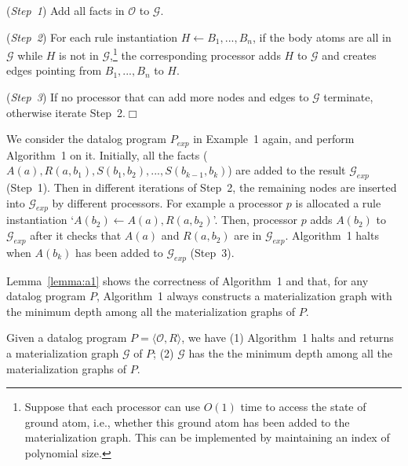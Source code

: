 \documentclass{article}
\begin{document}
(\emph{Step~1}) Add all facts in $\mathcal{O}$ to $\mathcal{G}$.

(\emph{Step~2}) For each rule instantiation $H\leftarrow B_1,...,B_n$, if the body atoms are all in $\mathcal{G}$ while $H$ is not in $\mathcal{G}$,\footnote{Suppose that each processor can use $O(1)$ time to access the state of ground atom, i.e., whether this ground atom has been added to the materialization graph. This can be implemented by maintaining an
index of polynomial size.}
the corresponding processor adds $H$ to $\mathcal{G}$ and creates edges pointing from $B_1,...,B_n$ to $H$.

(\emph{Step~3}) If no processor that can add more nodes and edges to $\mathcal{G}$ terminate, otherwise iterate Step~2.\hfill$\Box$\\

\begin{example}
We consider the datalog program $P_{exp}$ in Example~1 again, and perform Algorithm~1 on it. Initially, all the facts
($A(a),R(a,b_1),S(b_1,b_2),...,S(b_{k-1},b_{k})$) are added to the result $\mathcal{G}_{exp}$ (Step~1). Then in different iterations of Step~2, the remaining nodes are inserted into
$\mathcal{G}_{exp}$ by different processors. For example a processor $p$ is allocated a rule instantiation `$A(b_2)\leftarrow A(a),R(a,b_2)$'. Then, processor $p$ adds $A(b_2)$ to $\mathcal{G}_{exp}$ after it checks that $A(a)$ and $R(a,b_2)$ are in $\mathcal{G}_{exp}$. Algorithm~1 halts when $A(b_k)$ has been added to $\mathcal{G}_{exp}$ (Step~3).
\end{example}

Lemma~\ref{lemma:a1} shows the correctness of Algorithm~1 and that, for any datalog program $P$, Algorithm~1 always constructs a materialization graph with the minimum depth among all the materialization graphs of $P$.

\begin{lemma}\label{lemma:a1}
Given a datalog program $P=\langle\mathcal{O}, R\rangle$, we have (1) Algorithm~1 halts and returns a materialization graph $\mathcal{G}$ of $P$; (2) $\mathcal{G}$ has the the minimum depth among all the materialization graphs of $P$.
\end{lemma}
\end{document}
